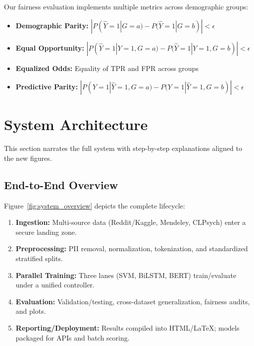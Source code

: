 \documentclass[conference]{IEEEtran}
\begin{document}
Our fairness evaluation implements multiple metrics across demographic groups:

\begin{itemize}
    \item \textbf{Demographic Parity:} $|P(\hat{Y}=1|G=a) - P(\hat{Y}=1|G=b)| < \epsilon$
    \item \textbf{Equal Opportunity:} $|P(\hat{Y}=1|Y=1,G=a) - P(\hat{Y}=1|Y=1,G=b)| < \epsilon$
    \item \textbf{Equalized Odds:} Equality of TPR and FPR across groups
    \item \textbf{Predictive Parity:} $|P(Y=1|\hat{Y}=1,G=a) - P(Y=1|\hat{Y}=1,G=b)| < \epsilon$
\end{itemize}

\section{System Architecture}

This section narrates the full system with step-by-step explanations aligned to the new figures.

\subsection{End-to-End Overview}
Figure~\ref{fig:system_overview} depicts the complete lifecycle:
\begin{enumerate}
  \item \textbf{Ingestion:} Multi-source data (Reddit/Kaggle, Mendeley, CLPsych) enter a secure landing zone.
  \item \textbf{Preprocessing:} PII removal, normalization, tokenization, and standardized stratified splits.
  \item \textbf{Parallel Training:} Three lanes (SVM, BiLSTM, BERT) train/evaluate under a unified controller.
  \item \textbf{Evaluation:} Validation/testing, cross-dataset generalization, fairness audits, and plots.
  \item \textbf{Reporting/Deployment:} Results compiled into HTML/LaTeX; models packaged for APIs and batch scoring.
\end{enumerate}
\end{document}
